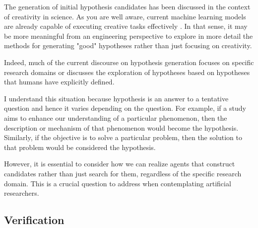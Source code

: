 \documentclass{book}
\begin{document}
The generation of initial hypothesis candidates has been discussed in the context of creativity in science. As you are well aware, current machine learning models are already capable of executing creative tasks effectively \cite{sep-creativity}. In that sense, it may be more meaningful from an engineering perspective to explore in more detail the methods for generating "good" hypotheses rather than just focusing on creativity. 

Indeed, much of the current discourse on hypothesis generation focuses on specific research domains or discusses the exploration of hypotheses based on hypotheses that humans have explicitly defined. 

I understand this situation because hypothesis is an answer to a tentative question and hence it varies depending on the question. For example, if a study aims to enhance our understanding of a particular phenomenon, then the description or mechanism of that phenomenon would become the hypothesis. Similarly, if the objective is to solve a particular problem, then the solution to that problem would be considered the hypothesis. 

However, it is essential to consider how we can realize agents that construct candidates rather than just search for them, regardless of the specific research domain. This is a crucial question to address when contemplating artificial researchers.






\subsection{Verification}
\end{document}
